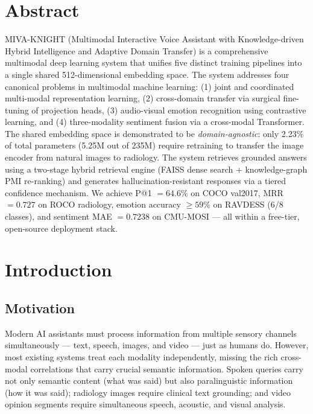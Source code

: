 \documentclass[12pt,a4paper]{article}
\theoremstyle{definition}
\theoremstyle{plain}
\theoremstyle{remark}
\begin{document}
\tableofcontents
\newpage

\section{Abstract}

MIVA-KNIGHT (Multimodal Interactive Voice Assistant with Knowledge-driven Hybrid Intelligence and Adaptive Domain Transfer) is a comprehensive multimodal deep learning system that unifies five distinct training pipelines into a single shared 512-dimensional embedding space. The system addresses four canonical problems in multimodal machine learning: (1) joint and coordinated multi-modal representation learning, (2) cross-domain transfer via surgical fine-tuning of projection heads, (3) audio-visual emotion recognition using contrastive learning, and (4) three-modality sentiment fusion via a cross-modal Transformer. The shared embedding space is demonstrated to be \emph{domain-agnostic}: only 2.23\% of total parameters (5.25M out of 235M) require retraining to transfer the image encoder from natural images to radiology. The system retrieves grounded answers using a two-stage hybrid retrieval engine (FAISS dense search + knowledge-graph PMI re-ranking) and generates hallucination-resistant responses via a tiered confidence mechanism. We achieve P@1 $= 64.6\%$ on COCO val2017, MRR $= 0.727$ on ROCO radiology, emotion accuracy $\geq 59\%$ on RAVDESS (6/8 classes), and sentiment MAE $= 0.7238$ on CMU-MOSI — all within a free-tier, open-source deployment stack.

\section{Introduction}

\subsection{Motivation}

Modern AI assistants must process information from multiple sensory channels simultaneously — text, speech, images, and video — just as humans do. However, most existing systems treat each modality independently, missing the rich cross-modal correlations that carry crucial semantic information. Spoken queries carry not only semantic content (what was said) but also paralinguistic information (how it was said); radiology images require clinical text grounding; and video opinion segments require simultaneous speech, acoustic, and visual analysis.
\end{document}
